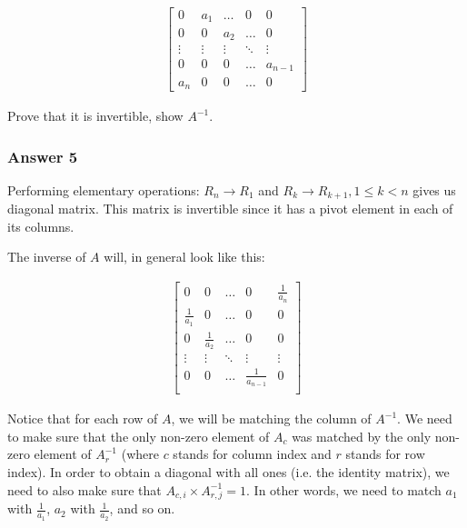 \documentclass[11pt]{article}
\begin{document}
\begin{align*}
  \begin{bmatrix}
    0      & a_1    & \dots  & 0      & 0 \\
    0      & 0      & a_2    & \dots  & 0 \\
    \vdots & \vdots & \vdots & \ddots & \vdots \\
    0      & 0      & 0      & \dots  & a_{n-1} \\
    a_n    & 0      & 0      & \dots  & 0
  \end{bmatrix}
\end{align*}

Prove that it is invertible, show \(A^{-1}\).

\subsubsection{Answer 5}
\label{sec:orgheadline8}
Performing elementary operations: \(R_n \to R_1\) and \(R_k \to R_{k+1}, 1 \leq
    k < n\) gives us diagonal matrix.  This matrix is invertible since it has a
pivot element in each of its columns.

The inverse of \(A\) will, in general look like this:

\begin{align*}
  \begin{bmatrix}
    0             & 0             & \dots  & 0                & \frac{1}{a_n} \\
    \frac{1}{a_1} & 0             & \dots  & 0                & 0 \\
    0             & \frac{1}{a_2} & \dots  & 0                & 0 \\
    \vdots        & \vdots        & \ddots & \vdots           & \vdots \\
    0             & 0             & \dots  & \frac{1}{a_{n-1}} & 0 \\
  \end{bmatrix}
\end{align*}

Notice that for each row of \(A\), we will be matching the column of \(A^{-1}\).
We need to make sure that the only non-zero element of \(A_c\) was matched by
the only non-zero element of \(A^{-1}_r\) (where \(c\) stands for column index
and \(r\) stands for row index).  In order to obtain a diagonal with all ones
(i.e. the identity matrix), we need to also make sure that \(A_{c,i} \times
    A^{-1}_{r,j} = 1\).  In other words, we need to match \(a_1\) with \(\frac{1}{a_1}\),
\(a_2\) with \(\frac{1}{a_2}\), and so on.
\end{document}

